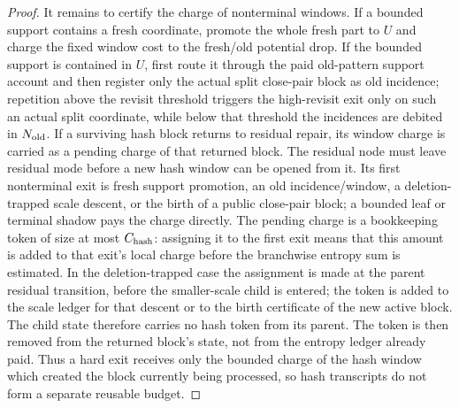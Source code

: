 \documentclass[11pt]{article}
\begin{document}
\begin{proof}
It remains to certify the charge of nonterminal windows.  If a bounded support
contains a fresh coordinate, promote the whole fresh part to $U$ and charge
the fixed window cost to the fresh/old potential drop.  If the bounded support
is contained in $U$, first route it through the paid old-pattern support
account and then register only the actual split close-pair block as old
incidence; repetition above the revisit threshold triggers the high-revisit
exit only on such an actual split coordinate, while below that threshold the
incidences are debited in $N_{\rm old}$.  If a surviving hash block
returns to residual repair, its window charge is carried as a pending charge
of that returned block.  The residual node must leave residual mode before a
new hash window can be opened from it.  Its first nonterminal exit is fresh
support promotion, an old incidence/window, a deletion-trapped scale descent,
or the birth of a public close-pair block; a bounded leaf or terminal shadow
pays the charge directly.  The pending charge is a bookkeeping token of size
at most $C_{\rm hash}$: assigning it to the first exit means that this amount
is added to that exit's local charge before the branchwise entropy sum is
estimated.  In the deletion-trapped case the assignment is made at the parent
residual transition, before the smaller-scale child is entered; the token is
added to the scale ledger for that descent or to the birth certificate of the
new active block.  The child state therefore carries no hash token from its
parent.  The token is then removed from the returned block's state, not from
the entropy ledger already paid.  Thus a hard exit receives only the bounded
charge of the hash window which created the block currently being processed,
so hash transcripts do not form a separate reusable budget.
\end{proof}
\end{document}
